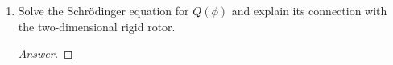 \documentclass[../psets.tex]{subfiles}
\begin{document}
\begin{enumerate}
\begin{enumerate}
\begin{proof}[Answer]
\begin{align*}
                &= \pdv[2]{r}(R(r)Q(\phi))+\frac{1}{r}\pdv{r}(R(r)Q(\phi))+\frac{1}{r^2}\pdv[2]{\phi}(R(r)Q(\phi))+\frac{2m}{\hbar^2}\left[ \frac{e^2}{4\pi\epsilon_0r}+E \right]R(r)Q(\phi)\\
                &= Q(\phi)\pdv[2]{R}{r}+\frac{Q(\phi)}{r}\pdv{R}{r}+\frac{R(r)}{r^2}\pdv[2]{Q}{\phi}+\frac{2m}{\hbar^2}\left[ \frac{e^2}{4\pi\epsilon_0r}+E \right]R(r)Q(\phi)\\
                &= \frac{r^2}{R(r)}\pdv[2]{R}{r}+\frac{r}{R(r)}\pdv{R}{r}+\frac{1}{Q(\phi)}\pdv[2]{Q}{\phi}+\frac{2mr^2}{\hbar^2}\left[ \frac{e^2}{4\pi\epsilon_0r}+E \right]
            \end{align*}
            Since $r$ and $\phi$ are independent variables, it follows that we may let
            \begin{align*}
                \Aboxed{m^2 &= \frac{r^2}{R(r)}\dv[2]{R}{r}+\frac{r}{R(r)}\dv{R}{r}+\frac{2mr^2}{\hbar^2}\left[ \frac{e^2}{4\pi\epsilon_0r}+E_n \right]}&
                \Aboxed{-m^2 &= \frac{1}{Q(\phi)}\dv[2]{Q}{\phi}}
            \end{align*}
        \end{proof}
        \item Solve the Schr\"{o}dinger equation for $Q(\phi)$ and explain its connection with the two-dimensional rigid rotor.
        \begin{proof}[Answer]



\end{proof}
\end{enumerate}
\end{enumerate}
\end{document}
